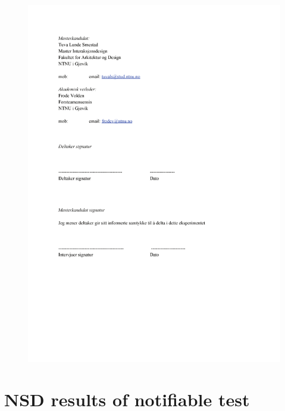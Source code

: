     \begin{figure}
        \centering
        \includegraphics[scale=0.8]{figures/samtykkex2.pdf}
    \end{figure}

\section{NSD results of notifiable test}
    \label{NSD}

